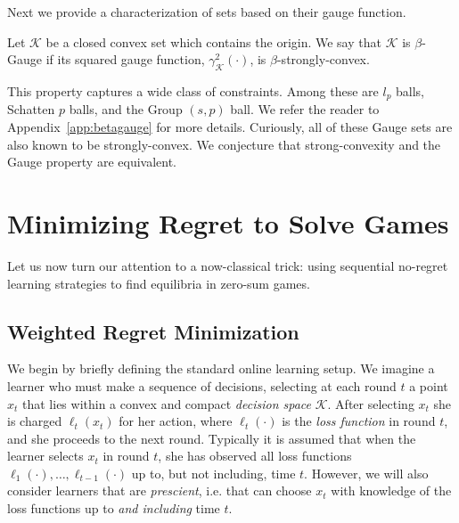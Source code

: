 \documentclass[pmlr]{jmlr} %
\def\g{\gamma_{\K}}
\def\K{\mathcal{K}}
\begin{document}
Next we provide a  characterization of sets based on their gauge function.
\begin{definition}
Let $\K$ be a closed convex set which contains the origin.
We say that $\K$  is $\beta$-Gauge if its squared gauge function, $\g^{2}(\cdot)$,  is $\beta$-strongly-convex.
\end{definition}
This property captures a wide class of constraints. Among these are $l_{p}$ balls, 
Schatten $p$ balls, and the Group $(s,p)$ ball. We refer the reader to Appendix~{\ref{app:betagauge}} for more details. Curiously, all of these Gauge sets are also known to be strongly-convex. We conjecture that strong-convexity and the Gauge property are equivalent.




\section{Minimizing Regret to Solve Games}


Let us now turn our attention to a now-classical trick: using sequential no-regret learning strategies to find equilibria in zero-sum games.

\subsection{Weighted Regret Minimization}

We begin by briefly defining the standard online learning setup. We imagine a learner who must make a sequence of decisions, selecting at each round $t$ a point $x_{t}$ that lies within a convex and compact \emph{decision space} $\K$.
After selecting $x_{t}$ she is charged $\ell_{t}(x_{t})$ for her action, where $\ell_{t}(\cdot)$ is the \emph{loss function} in round $t$, and she proceeds to the next round.
Typically it is assumed that when the learner selects $x_{t}$ in round $t$, she has observed all loss functions $\ell_{1}(\cdot), \ldots, \ell_{t-1}(\cdot)$ up to, but not including, time $t$. However, we will also consider learners that are \emph{prescient}, i.e. that can choose $x_{t}$ with knowledge of the loss functions up to \emph{and including} time $t$.
\end{document}
